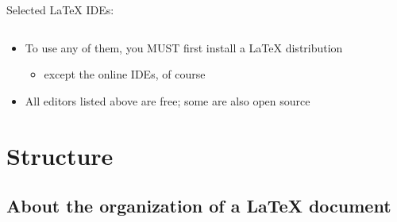 \documentclass{beamer}
\begin{document}
\begin{frame}
\begin{block}{Selected \LaTeX{} IDEs:}
\begin{columns}

\end{columns}

\end{block}

\begin{itemize}
  \item To use any of them, you MUST first install a \LaTeX{} distribution
\begin{itemize}
  \item except the online IDEs, of course
\end{itemize}
  \item All editors listed above are free; some are also open source
\end{itemize}

  
\end{frame}

\section[Structure]{Structure}




\subsection{About the organization of a \LaTeX{} document}
\end{document}
